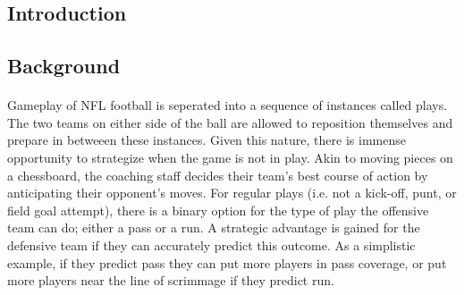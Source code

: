 \documentclass{article}
\begin{document}
    \begin{multicols*}{2}
    
    \section{Introduction}

        \subsection{Background}
            
            \paragraph{}
                Gameplay of NFL football is seperated into a sequence of instances called plays. 
                The two teams on either side of the ball are allowed to reposition themselves and prepare in betweeen these instances. 
                Given this nature, there is immense opportunity to strategize when the game is not in play.
                Akin to moving pieces on a chessboard, the coaching staff decides their team's best course of action by anticipating their opponent's moves.  
                For regular plays (i.e. not a kick-off, punt, or field goal attempt), there is a binary option for the type of play the offensive team can do; either a pass or a run.
                A strategic advantage is gained for the defensive team if they can accurately predict this outcome. 
                As a simplistic example, if they predict pass they can put more players in pass coverage, or put more players near the line of scrimmage if they predict run.
            
            \vspace{-10pt}


\end{multicols*}
\end{document}
